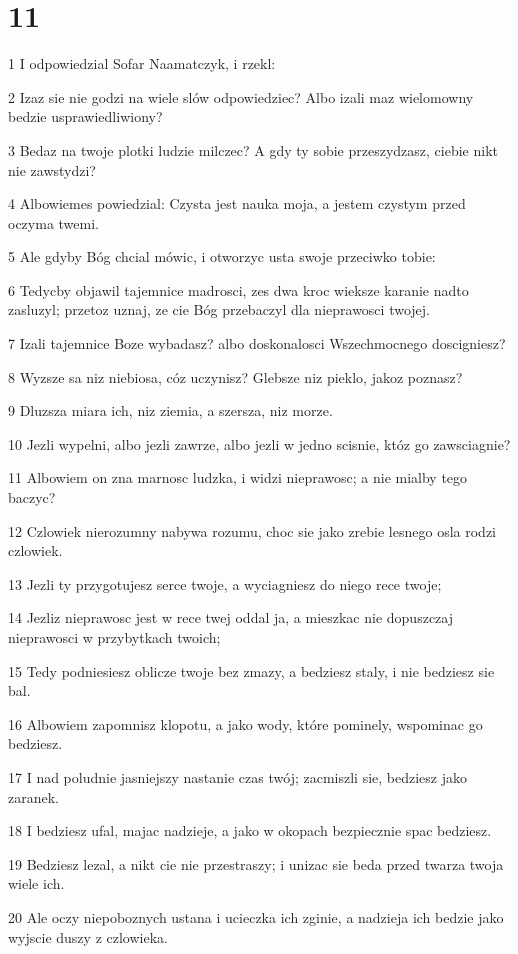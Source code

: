 \chapter{11}

\par 1 I odpowiedzial Sofar Naamatczyk, i rzekl:
\par 2 Izaz sie nie godzi na wiele slów odpowiedziec? Albo izali maz wielomowny bedzie usprawiedliwiony?
\par 3 Bedaz na twoje plotki ludzie milczec? A gdy ty sobie przeszydzasz, ciebie nikt nie zawstydzi?
\par 4 Albowiemes powiedzial: Czysta jest nauka moja, a jestem czystym przed oczyma twemi.
\par 5 Ale gdyby Bóg chcial mówic, i otworzyc usta swoje przeciwko tobie:
\par 6 Tedycby objawil tajemnice madrosci, zes dwa kroc wieksze karanie nadto zasluzyl; przetoz uznaj, ze cie Bóg przebaczyl dla nieprawosci twojej.
\par 7 Izali tajemnice Boze wybadasz? albo doskonalosci Wszechmocnego doscigniesz?
\par 8 Wyzsze sa niz niebiosa, cóz uczynisz? Glebsze niz pieklo, jakoz poznasz?
\par 9 Dluzsza miara ich, niz ziemia, a szersza, niz morze.
\par 10 Jezli wypelni, albo jezli zawrze, albo jezli w jedno scisnie, któz go zawsciagnie?
\par 11 Albowiem on zna marnosc ludzka, i widzi nieprawosc; a nie mialby tego baczyc?
\par 12 Czlowiek nierozumny nabywa rozumu, choc sie jako zrebie lesnego osla rodzi czlowiek.
\par 13 Jezli ty przygotujesz serce twoje, a wyciagniesz do niego rece twoje;
\par 14 Jezliz nieprawosc jest w rece twej oddal ja, a mieszkac nie dopuszczaj nieprawosci w przybytkach twoich;
\par 15 Tedy podniesiesz oblicze twoje bez zmazy, a bedziesz staly, i nie bedziesz sie bal.
\par 16 Albowiem zapomnisz klopotu, a jako wody, które pominely, wspominac go bedziesz.
\par 17 I nad poludnie jasniejszy nastanie czas twój; zacmiszli sie, bedziesz jako zaranek.
\par 18 I bedziesz ufal, majac nadzieje, a jako w okopach bezpiecznie spac bedziesz.
\par 19 Bedziesz lezal, a nikt cie nie przestraszy; i unizac sie beda przed twarza twoja wiele ich.
\par 20 Ale oczy niepoboznych ustana i ucieczka ich zginie, a nadzieja ich bedzie jako wyjscie duszy z czlowieka.

